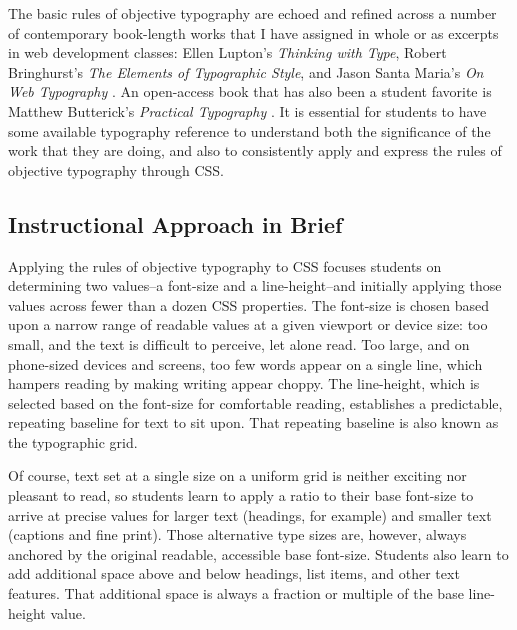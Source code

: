 \documentclass[sigplan,screen]{acmart}
\begin{document}
The basic rules of objective typography are echoed and refined across a number of contemporary book-length works that I have assigned in whole or as excerpts in web development classes: Ellen Lupton’s {\itshape Thinking with Type}, Robert Bringhurst’s {\itshape The Elements of Typographic Style}, and Jason Santa Maria’s {\itshape On Web Typography} \cite{el:type,rb:style,jsm:owt}. An open-access book that has also been a student favorite is Matthew Butterick’s {\itshape Practical Typography} \cite{mb:pt}. It is essential for students to have some available typography reference to understand both the significance of the work that they are doing, and also to consistently apply and express the rules of objective typography through CSS.

\subsection{Instructional Approach in Brief}

Applying the rules of objective typography to CSS focuses students on determining two values--a font-size and a line-height--and initially applying those values across fewer than a dozen CSS properties. The font-size is chosen based upon a narrow range of readable values at a given viewport or device size: too small, and the text is difficult to perceive, let alone read. Too large, and on phone-sized devices and screens, too few words appear on a single line, which hampers reading by making writing appear choppy. The line-height, which is selected based on the font-size for comfortable reading, establishes a predictable, repeating baseline for text to sit upon. That repeating baseline is also known as the typographic grid. 

Of course, text set at a single size on a uniform grid is neither exciting nor pleasant to read, so students learn to apply a ratio to their base font-size to arrive at precise values for larger text (headings, for example) and smaller text (captions and fine print). Those alternative type sizes are, however, always anchored by the original readable, accessible base font-size. Students also learn to add additional space above and below headings, list items, and other text features. That additional space is always a fraction or multiple of the base line-height value.
\end{document}
